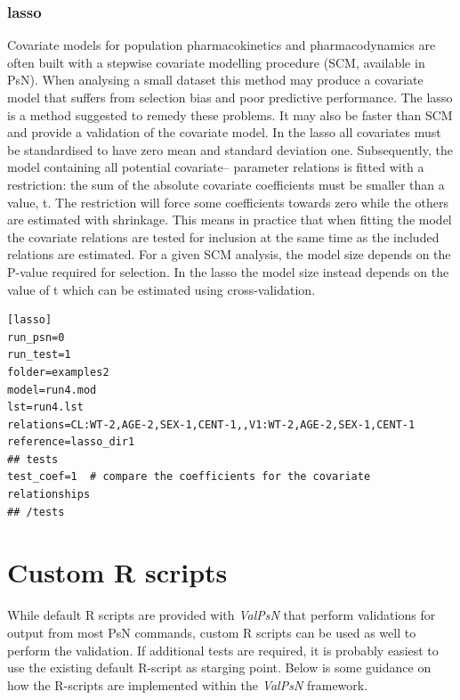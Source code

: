 \documentclass[a4,11pt]{report} \usepackage[pdftex]{graphicx}
\newcommand{\ValPsN}{\textcolor{PiranaOrange}{\textit{ValPsN}}\xspace}
\begin{document}
\subsubsection{lasso}
Covariate models for population pharmacokinetics and pharmacodynamics
are often built with a stepwise covariate modelling procedure (SCM,
available in PsN). When analysing a small dataset this method may
produce a covariate model that suffers from selection bias and poor
predictive performance. The lasso is a method suggested to remedy
these problems. It may also be faster than SCM and provide a
validation of the covariate model. In the lasso all covariates must be
standardised to have zero mean and standard deviation
one. Subsequently, the model containing all potential covariate–
parameter relations is fitted with a restriction: the sum of the
absolute covariate coefficients must be smaller than a value, t. The
restriction will force some coefficients towards zero while the others
are estimated with shrinkage. This means in practice that when fitting
the model the covariate relations are tested for inclusion at the same
time as the included relations are estimated. For a given SCM
analysis, the model size depends on the P-value required for
selection. In the lasso the model size instead depends on the value of
t which can be estimated using cross-validation.

\vspace{10pt}

\begin{lstlisting}
[lasso]
run_psn=0
run_test=1
folder=examples2
model=run4.mod
lst=run4.lst
relations=CL:WT-2,AGE-2,SEX-1,CENT-1,,V1:WT-2,AGE-2,SEX-1,CENT-1
reference=lasso_dir1
## tests
test_coef=1  # compare the coefficients for the covariate relationships
## /tests
\end{lstlisting}

\newpage

\section{Custom R scripts}
While default R scripts are provided with \ValPsN that perform
validations for output from most PsN commands, custom R scripts can be
used as well to perform the validation. If additional tests are
required, it is probably easiest to use the existing default R-script
as starging point. Below is some guidance on how the R-scripts are
implemented within the \ValPsN framework.

\vspace{10pt}
\end{document}
